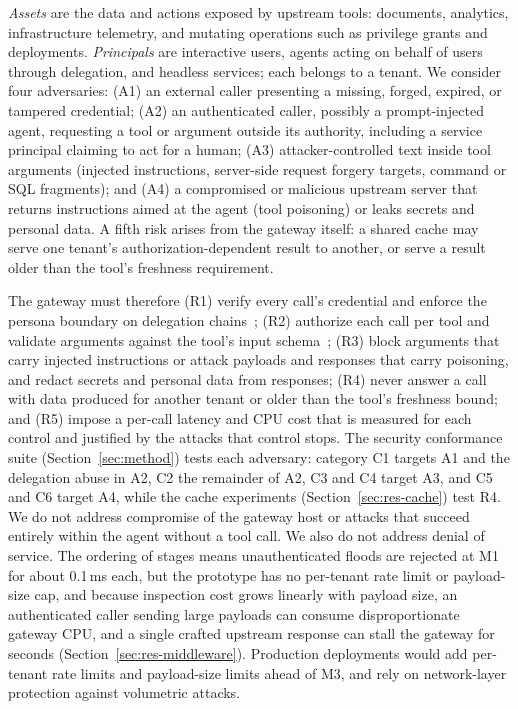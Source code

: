 \documentclass{ieeeaccess}
\newcommand{\ms}{\,ms\xspace}
\begin{document}
\emph{Assets} are the data and actions exposed by upstream tools: documents, analytics, infrastructure telemetry, and mutating operations such as privilege grants and deployments. \emph{Principals} are interactive users, agents acting on behalf of users through delegation, and headless services; each belongs to a tenant. We consider four adversaries: (A1) an external caller presenting a missing, forged, expired, or tampered credential; (A2) an authenticated caller, possibly a prompt-injected agent, requesting a tool or argument outside its authority, including a service principal claiming to act for a human; (A3) attacker-controlled text inside tool arguments (injected instructions, server-side request forgery targets, command or SQL fragments); and (A4) a compromised or malicious upstream server that returns instructions aimed at the agent (tool poisoning) or leaks secrets and personal data. A fifth risk arises from the gateway itself: a shared cache may serve one tenant's authorization-dependent result to another, or serve a result older than the tool's freshness requirement.

The gateway must therefore (R1) verify every call's credential and enforce the persona boundary on delegation chains~\cite{kumar2026gateway,jones2020rfc8693,hardy1988confused}; (R2) authorize each call per tool and validate arguments against the tool's input schema~\cite{li2026zerotrust}; (R3) block arguments that carry injected instructions or attack payloads and responses that carry poisoning, and redact secrets and personal data from responses; (R4) never answer a call with data produced for another tenant or older than the tool's freshness bound; and (R5) impose a per-call latency and CPU cost that is measured for each control and justified by the attacks that control stops. The security conformance suite (Section~\ref{sec:method}) tests each adversary: category C1 targets A1 and the delegation abuse in A2, C2 the remainder of A2, C3 and C4 target A3, and C5 and C6 target A4, while the cache experiments (Section~\ref{sec:res-cache}) test R4. We do not address compromise of the gateway host or attacks that succeed entirely within the agent without a tool call. We also do not address denial of service. The ordering of stages means unauthenticated floods are rejected at M1 for about 0.1\ms each, but the prototype has no per-tenant rate limit or payload-size cap, and because inspection cost grows linearly with payload size, an authenticated caller sending large payloads can consume disproportionate gateway CPU, and a single crafted upstream response can stall the gateway for seconds (Section~\ref{sec:res-middleware}). Production deployments would add per-tenant rate limits and payload-size limits ahead of M3, and rely on network-layer protection against volumetric attacks.
\end{document}
